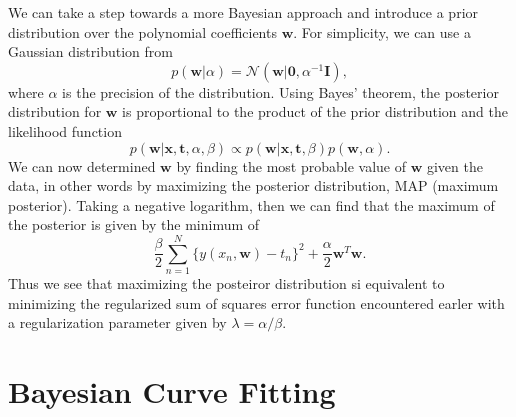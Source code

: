 We can take a step towards a more Bayesian approach and introduce a prior distribution over the polynomial coefficients $\mathbf{w}$. For simplicity, we can use a Gaussian distribution from
\begin{equation}
	p(\mathbf{w}|\alpha) = \mathcal{N}(\mathbf{w|0},\alpha^{-1}\mathbf{I}),
	\label{eq:prior_hyper}
\end{equation}
where $\alpha$ is the precision of the distribution. Using Bayes' theorem, the posterior distribution for $\mathbf{w}$ is proportional to the product of the prior distribution and the likelihood function
\begin{equation}
	p(\mathbf{w|x,t},\alpha,\beta)\propto p(\mathbf{w|x,t},\beta)p(\mathbf{w},\alpha).
	\label{eq:bayes_reg}
\end{equation}
We can now determined $\mathbf{w}$ by finding the most probable value of $\mathbf{w}$ given the data, in other words by maximizing the posterior distribution, MAP (maximum posterior). Taking a negative logarithm, then we can find that the maximum of the posterior is given by the minimum of 
\begin{equation}
	\frac{\beta}{2}\sum_{n=1}^N \{y(x_n,\mathbf{w})-t_n\}^2+\frac{\alpha}{2}\mathbf{w}^T\mathbf{w}.
	\label{eq:bayes_}
\end{equation}
Thus we see that maximizing the posteiror distribution si equivalent to minimizing the regularized sum of squares error function encountered earler with a regularization parameter given by $\lambda = \alpha/\beta$.



\section{Bayesian Curve Fitting}





